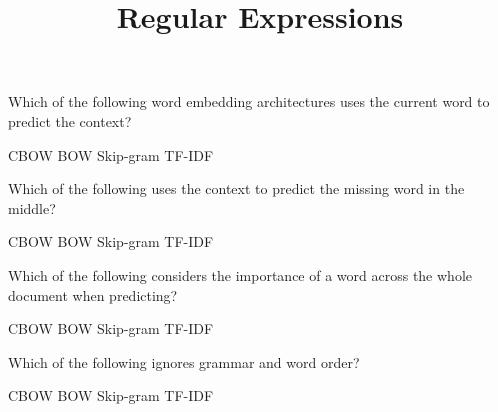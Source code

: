 \documentclass[theme=sleek, randomorder, hidesidemenu]{webquiz}
\title{Regular Expressions}
\begin{document}
\begin{question}
  Which of the following word embedding architectures uses the current word to predict the context?
  \begin{choice}
    \incorrect CBOW
    \incorrect BOW
    \correct Skip-gram
    \incorrect TF-IDF
  \end{choice}
\end{question}

\begin{question}
  Which of the following uses the context to predict the missing word in the middle?
  \begin{choice}
    \correct CBOW
    \incorrect BOW
    \incorrect Skip-gram
    \incorrect TF-IDF
  \end{choice}
\end{question}

\begin{question}
  Which of the following considers the importance of a word across the whole document when predicting?
  \begin{choice}
    \incorrect CBOW
    \incorrect BOW
    \incorrect Skip-gram
    \correct TF-IDF
  \end{choice}
\end{question}

\begin{question}
  Which of the following ignores grammar and word order?
  \begin{choice}
    \incorrect CBOW
    \correct BOW
    \incorrect Skip-gram
    \incorrect TF-IDF
  \end{choice}
\end{question}


\end{document}

